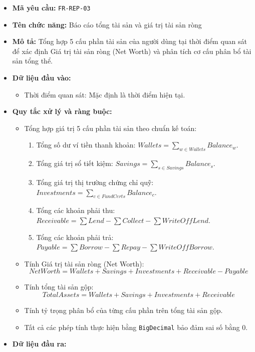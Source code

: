 \documentclass[11pt,a4paper]{article}
\providecommand{\tightlist}{
  \setlength{\itemsep}{0pt}\setlength{\parskip}{0pt}}
\begin{document}
\begin{itemize}
\tightlist
\item
  \textbf{Mã yêu cầu:} \texttt{FR-REP-03}
\item
  \textbf{Tên chức năng:} Báo cáo tổng tài sản và giá trị tài sản ròng
\item
  \textbf{Mô tả:} Tổng hợp 5 cấu phần tài sản của người dùng tại thời
  điểm quan sát để xác định Giá trị tài sản ròng (Net Worth) và phân
  tích cơ cấu phân bổ tài sản tổng thể.
\item
  \textbf{Dữ liệu đầu vào:}

  \begin{itemize}
  \tightlist
  \item
    Thời điểm quan sát: Mặc định là thời điểm hiện tại.
  \end{itemize}
\item
  \textbf{Quy tắc xử lý và ràng buộc:}

  \begin{itemize}
  \tightlist
  \item
    Tổng hợp giá trị 5 cấu phần tài sản theo chuẩn kế toán:

    \begin{enumerate}
    \def\labelenumi{\arabic{enumi}.}
    \tightlist
    \item
      Tổng số dư ví tiền thanh khoản:
      \(Wallets = \sum_{w \in Wallets} Balance_w\).
    \item
      Tổng giá trị sổ tiết kiệm:
      \(Savings = \sum_{s \in Savings} Balance_s\).
    \item
      Tổng giá trị thị trường chứng chỉ quỹ:
      \(Investments = \sum_{c \in FundCerts} Balance_c\).
    \item
      Tổng các khoản phải thu:
      \(Receivable = \sum Lend - \sum Collect - \sum WriteOffLend\).
    \item
      Tổng các khoản phải trả:
      \(Payable = \sum Borrow - \sum Repay - \sum WriteOffBorrow\).
    \end{enumerate}
  \item
    Tính Giá trị tài sản ròng (Net Worth):
    \[NetWorth = Wallets + Savings + Investments + Receivable - Payable\]
  \item
    Tính tổng tài sản gộp:
    \[
    TotalAssets = Wallets + Savings + Investments + Receivable
    \]
  \item
    Tính tỷ trọng phân bổ của từng cấu phần trên tổng tài sản gộp.
  \item
    Tất cả các phép tính thực hiện bằng \texttt{BigDecimal} bảo đảm sai
    số bằng 0.
  \end{itemize}
\item
  \textbf{Dữ liệu đầu ra:}


\end{itemize}
\end{document}
